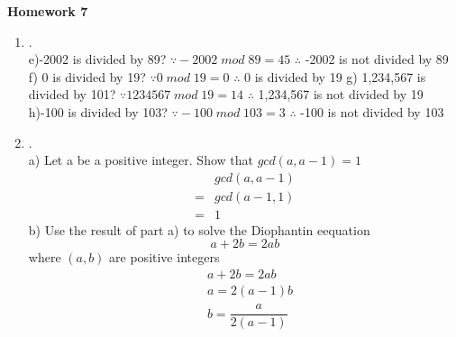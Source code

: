 \documentclass{article}
\theoremstyle{definition}
\theoremstyle{plain}
\begin{document}
\begin{center} \bf \LARGE Homework 7\\
\end{center}


\begin {enumerate}[itemindent=30pt,label=\bf Exercise {\arabic*}:]
\item .\\
\subitem e)-2002 is divided by 89?
\subitem \qquad $\because -2002\;mod\;89 = 45$
\subitem \qquad $\therefore$ -2002 is not divided by 89
\subitem f) 0 is divided by 19?
\subitem \qquad $\because 0\;mod\;19 = 0$
\subitem \qquad $\therefore$ 0 is divided by 19
\subitem g) 1,234,567 is divided by 101?
\subitem \qquad $\because 1234567\;mod\;19 = 14$
\subitem \qquad $\therefore$ 1,234,567 is not divided by 19
\subitem h)-100 is divided by 103?
\subitem \qquad $\because -100\;mod\;103 = 3$
\subitem \qquad $\therefore$ -100 is not divided by 103
\item .\\
\subitem a) Let a be a positive integer. Show that $gcd(a,a-1) = 1$
\begin{align*}
	 &gcd(a, a-1) \\
    =&gcd(a-1, 1) \\
    =&1
\end{align*}
\subitem b) Use the result of part a) to solve the Diophantin eequation $$a+2b=2ab$$\qquad \qquad  where $(a,b)$ are positive integers
\begin{align*}
	& a+2b = 2ab\\
	& a = 2(a-1)b\\
	& b = \dfrac{a}{2(a-1)}
\end{align*}


\end{enumerate}
\end{document}
